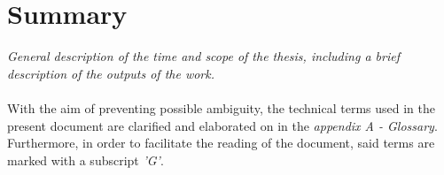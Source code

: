 
\cleardoublepage
{}
{}
\begingroup
\let\clearpage\relax
\let\cleardoublepage\relax
\let\cleardoublepage\relax

\chapter*{Summary}

\textit{General description of the time and scope of the thesis, including a brief description of the outputs of the work.}
\\ \\
With the aim of preventing possible ambiguity, the technical terms used in the present document are clarified and elaborated on in the \textit{appendix A - Glossary}. Furthermore, in order to facilitate the reading of the document, said terms are marked with a subscript \textit{'G'}.
%
%

\endgroup			

\vfill

